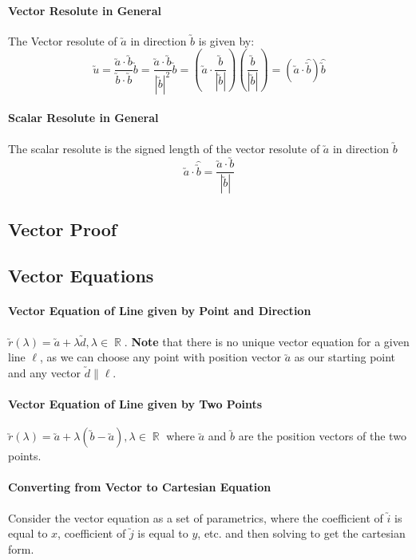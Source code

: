 \documentclass[a4paper,twoside,10pt]{article}
\DeclareMathOperator\R{\mathbb{R}}
\begin{document}
			\paragraph{Vector Resolute in General}
			The Vector resolute of $\utilde{a}$ in direction $\utilde{b}$ is given by:
			\[
				\utilde{u}=\frac{\utilde{a}\cdot\utilde{b}}{\utilde{b}\cdot\utilde{b}}\utilde{b}=\frac{\utilde{a}\cdot\utilde{b}}{|\utilde{b}|^2}\utilde{b}=\left(\utilde{a}\cdot\frac{\utilde{b}}{|\utilde{b}|}\right)\left(\frac{\utilde{b}}{|\utilde{b}|}\right)=\left(\utilde{a}\cdot\hat{\utilde{b}}\right)\hat{\utilde{b}}
			\]
			\paragraph{Scalar Resolute in General} The scalar resolute is the signed length of the vector resolute of $\utilde{a}$ in direction $\utilde{b}$
			\[
				\utilde{a}\cdot\hat{\utilde{b}}=\frac{\utilde{a}\cdot\utilde{b}}{|\utilde{b}|}
			\]
		\subsection{Vector Proof}
		\subsection{Vector Equations}
			\paragraph{Vector Equation of Line given by Point and Direction} $\utilde{r}(\lambda)=\utilde{a}+\lambda\utilde{d},\lambda\in\R$. \textbf{Note} that there is no unique vector equation for a given line $\ell$, as we can choose any point with position vector $\utilde{a}$ as our starting point and any vector $\utilde{d}\parallel \ell$.
			
			\paragraph{Vector Equation of Line given by Two Points} $\utilde{r}(\lambda)=\utilde{a}+\lambda\left(\utilde{b}-\utilde{a}\right),\lambda\in\R$ where $\utilde{a}$ and $\utilde{b}$ are the position vectors of the two points.
			
			\paragraph{Converting from Vector to Cartesian Equation} Consider the vector equation as a set of parametrics, where the coefficient of $\utilde{i}$ is equal to $x$, coefficient of $\utilde{j}$ is equal to $y$, etc. and then solving to get the cartesian form.
			
\end{document}
